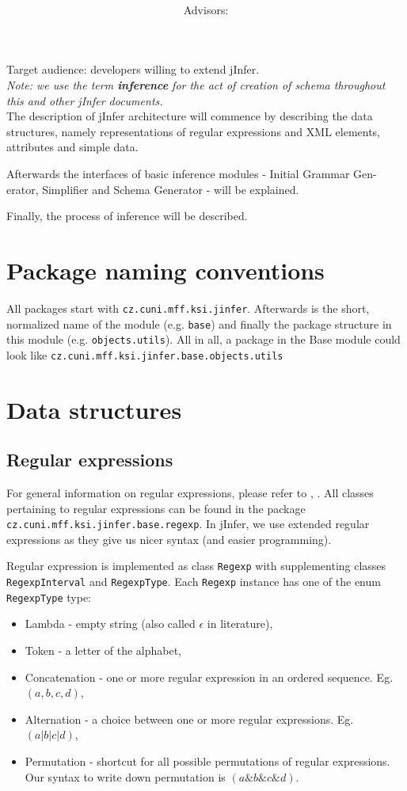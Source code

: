 \documentclass[a4paper,10pt,oneside]{article}
\title{\bf\mftitle}
\author{\mfauthor \\ Advisors: \mfadvisor}
\date{\mfplacedate}
\newcommand{\code}[1]{\texttt{#1}}
\begin{document}
\maketitle
Target audience: developers willing to extend jInfer.\\

\textit{Note: we use the term \textbf{inference} for the act of creation of schema throughout this and other jInfer documents.}\\

The description of jInfer architecture will commence by describing the data
structures, namely representations of regular expressions and XML elements,
attributes and simple data.

Afterwards the interfaces of basic inference modules - Initial Grammar Gen-
erator, Simplifier and Schema Generator - will be explained.

Finally, the process of inference will be described.

\section{Package naming conventions}
All packages start with \code{cz.cuni.mff.ksi.jinfer}. Afterwards is the short, normalized name of the module (e.g. \code{base}) and finally the package structure in this module (e.g. \texttt{objects.utils}). All in all, a package in the Base module could look like 
\code{cz.cuni.mff.ksi.jinfer.base.objects.utils}

\section{Data structures}
\subsection{Regular expressions}

For general information on regular expressions, please refer to \cite{wikiregexp}, \cite{automatatheory}.
All classes pertaining to regular expressions can be found in the package \code{cz.cuni.mff.ksi.jinfer.base.regexp}.
In jInfer, we use extended regular expressions as they give us nicer syntax (and easier programming).

Regular expression is implemented as class \code{Regexp} with supplementing classes \code{RegexpInterval} and \code{RegexpType}.
Each \code{Regexp} instance has one of the enum \code{RegexpType} type:
\begin{itemize}
	\item Lambda - empty string (also called $\epsilon$ in literature),
	\item Token - a letter of the alphabet,
	\item Concatenation - one or more regular expression in an ordered sequence. Eg. $(a, b, c, d)$,
	\item Alternation - a choice between one or more regular expressions. Eg. $(a | b | c | d)$,
	\item Permutation - shortcut for all possible permutations of regular expressions. Our syntax to write down permutation is $(a\& b\& c\& d)$.
\end{itemize}
\end{document}
